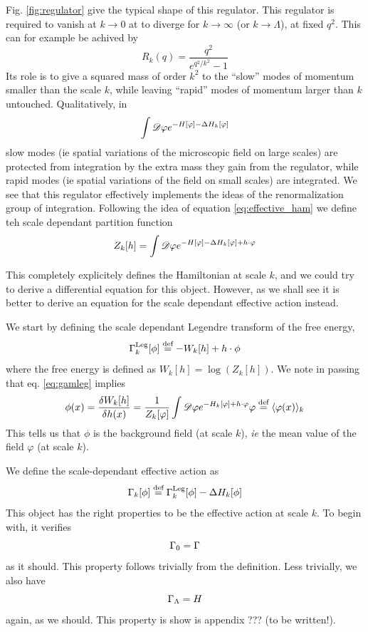 Fig. \ref{fig:regulator} give the typical shape of this regulator. This regulator is required to vanish at $k \rightarrow 0$ at to diverge for $k \rightarrow \infty$ (or $k \rightarrow \Lambda$), at fixed $q^2$. This can for example be achived by
\begin{equation}
R_k(q) = \frac{q^2}{e^{q^2/k^2} - 1}
\end{equation}
 Its role is to give a squared mass of order $k^2$ to the ``slow'' modes of momentum smaller than the scale $k$, while leaving ``rapid'' modes of momentum larger than $k$ untouched. Qualitatively, in  
\begin{equation}
\int  \mathscr{D}  \varphi e^{-H[\varphi] - \Delta H_k[\varphi]}
\end{equation}
slow modes (ie spatial variations of the microscopic field on large scales) are protected from integration by the extra mass they gain from the regulator, while rapid modes (ie spatial variations of the field on small scales) are integrated. We see that this regulator effectively implements the ideas of the renormalization group of integration. Following the idea of equation \ref{eq:effective_ham} we define teh scale dependant partition function
\begin{equation}
Z_k[h] = \int  \mathscr{D}  \varphi e^{-H[\varphi] - \Delta H_k[\varphi] + h \cdot \varphi}
\end{equation}

This completely explicitely defines the Hamiltonian at scale $k$, and we could try to derive a differential equation for this object. However, as we shall see it is better to derive an equation for the scale dependant effective action instead.

We start by defining the scale dependant Legendre transform of the free energy,
\begin{equation}
\label{eq:gamleg}
\Gamma_k^{\text{Leg}}[\phi]  \overset{\text{def}}{=}  - W_k[h] + h \cdot \phi
\end{equation}
where the free energy is defined as $W_k[h] = \log(Z_k[h])$.
We note in passing that eq. \ref{eq:gamleg} implies 
\begin{equation}
\phi(x) = \frac{\delta W_k[h]}{\delta h(x)} = \frac{1}{Z_k[\varphi]} \int  \mathscr{D}  \varphi e^{-H_k[\varphi] + h \cdot \varphi} \varphi  \overset{\text{def}}{=}  \langle \varphi(x) \rangle_k
\end{equation}
This tells us that $\phi$ is the background field (at scale $k$), \textit{ie} the mean value of the field $\varphi$ (at scale $k$). 

We define the scale-dependant effective action as
\begin{equation}
\Gamma_k[\phi]  \overset{\text{def}}{=}  \Gamma_k^{\text{Leg}}[\phi] - \Delta H_k[\phi]
\end{equation}
This object has the right properties to be the effective action at scale $k$. To begin with, it verifies
\begin{equation}
\Gamma_0 = \Gamma
\end{equation}
as it should. This property follows trivially from the definition. Less trivially, we also have
\begin{equation}
\Gamma_\Lambda = H
\end{equation}
again, as we should. This property is show is appendix ??? (to be written!).

